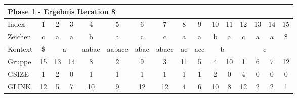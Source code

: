 \begin{table}[H]
\centering
\begin{adjustbox}{max width=\textwidth}
\begin{tabular}{lccccccccccccccc}
\multicolumn{16}{l}{Phase 1 - Ergebnis Iteration 8}                                                                                                                                                                                                                                                                               \\ \hline
\multicolumn{1}{l|}{Index}   & 1                       & 2  & 3                       & \cellcolor[HTML]{\green}4  & 5                           & 6                         & 7                          & 8                         & 9                        & 10 & 11                      & 12  & 13  & 14  & 15  \\
\multicolumn{1}{l|}{Zeichen} & c                       & a  & a                       & b                          & a                           & c                         & c                          & a                         & a                        & b  & a                       & c   & a   & a   & \$  \\ \cline{1-16}
\multicolumn{1}{l|}{Kontext} & \multicolumn{1}{c|}{\$} & \multicolumn{2}{c|}{a}       & \multicolumn{1}{c|}{aabac} & \multicolumn{1}{c|}{aabacc} & \multicolumn{1}{c|}{abac} & \multicolumn{1}{c|}{abacc} & \multicolumn{1}{c|}{ac}   & \multicolumn{1}{c|}{acc} & \multicolumn{2}{c|}{b}       & \multicolumn{4}{c}{c} \\
\multicolumn{1}{l|}{Gruppe}      & \multicolumn{1}{c|}{15} & 13 & \multicolumn{1}{c|}{14} & \multicolumn{1}{c|}{8}     & \multicolumn{1}{c|}{2}      & \multicolumn{1}{c|}{9}    & \multicolumn{1}{c|}{3}     & \multicolumn{1}{c|}{11}   & \multicolumn{1}{c|}{5}   & 4  & \multicolumn{1}{c|}{10} & 1   & 6   & 7   & 12  \\
\multicolumn{1}{l|}{GSIZE}   & \multicolumn{1}{c|}{1}  & 2  & \multicolumn{1}{c|}{0}  & \multicolumn{1}{c|}{1}     & \multicolumn{1}{c|}{1}      & \multicolumn{1}{c|}{1}    & \multicolumn{1}{c|}{1}     & \multicolumn{1}{c|}{1}    & \multicolumn{1}{c|}{1}   & 2  & \multicolumn{1}{c|}{0}  & 4   & 0   & 0   & 0   \\
\multicolumn{1}{l|}{GLINK}   & 12                      & 5  & 7                       & 10                         & 9                           & 12                        & 12                         & 4                         & 6                        & 10 & 8                       & 12  & 2   & 2   & 1   \\

\end{tabular}
\end{adjustbox}
\end{table}
